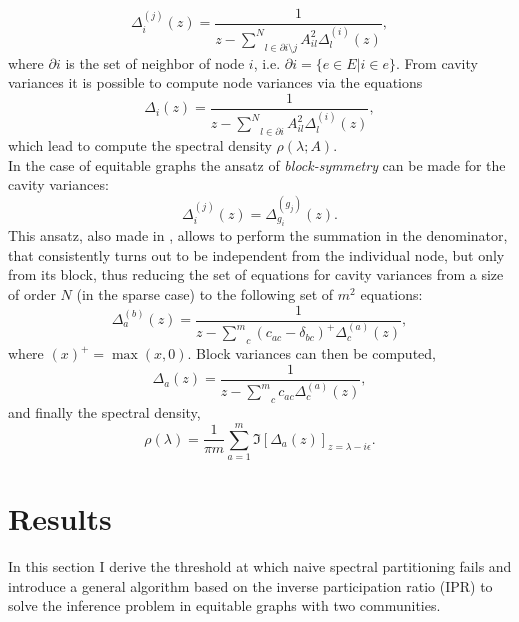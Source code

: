 \documentclass[%
 reprint,
 amsmath,amssymb,
 aps,
 pre,
 showpacs
]{revtex4-1}
\begin{document}
\begin{equation}\label{eq:cavityVar}
\Delta_{i}^{(j)}(z)=\frac{1}{z-\underset{l\in\partial i\setminus j}{\overset{N}{\sum}}A_{il}^{2}\Delta_{l}^{(i)}(z)},
\end{equation}
where $\partial i$ is the set of neighbor of node $i$, i.e. $\partial i = \{e \in E | i \in e\}$.
From cavity variances it is possible to compute node variances via the equations
\begin{equation}\label{eq:nodeVar}
\Delta_{i}(z)=\frac{1}{z-\underset{l\in\partial i}{\overset{N}{\sum}}A_{il}^{2}\Delta_{l}^{(i)}(z)},
\end{equation}
which lead to compute the spectral density $\rho(\lambda;A)$. \\
In the case of equitable graphs the ansatz of \textit{block-symmetry} can be made for the cavity variances:
\begin{equation}\label{eq:ansatz}
\Delta_{i}^{(j)}(z) = \Delta_{g_i}^{(g_j)}(z).
\end{equation}
This ansatz, also made in \cite{newman2014equitable}, allows to perform the summation in the denominator, that consistently turns out to be independent from the individual node, but only from its block, thus reducing the set of equations for cavity variances from a size of order $N$ (in the sparse case) to the following set of $m^2$ equations:
\begin{equation}\label{eq:ansatzCav}
\Delta_{a}^{(b)}(z)=\frac{1}{z-\underset{c}{\overset{m}{\sum}}(c_{ac}-\delta_{bc})^+\Delta_{c}^{(a)}(z)},
\end{equation}
where $(x)^+ = \max(x,0)$.
Block variances can then be computed,
\begin{equation}\label{eq:blockVar}
\Delta_{a}(z)=\frac{1}{z-\underset{c}{\overset{m}{\sum}}c_{ac}\Delta_{c}^{(a)}(z)},
\end{equation}
and finally the spectral density,
\begin{equation}\label{eq:equitablespec}
\rho(\lambda)=\frac{1}{\pi m}\underset{a=1}{\overset{m}{\sum}}\Im[\Delta_{a}(z)]_{z=\lambda-i\epsilon}.
\end{equation}

\section{\label{sec:res}Results}

In this section I derive the threshold at which naive spectral partitioning fails and introduce a general algorithm based on the inverse participation ratio (IPR) to solve the inference problem in equitable graphs with two communities. \\
\end{document}
